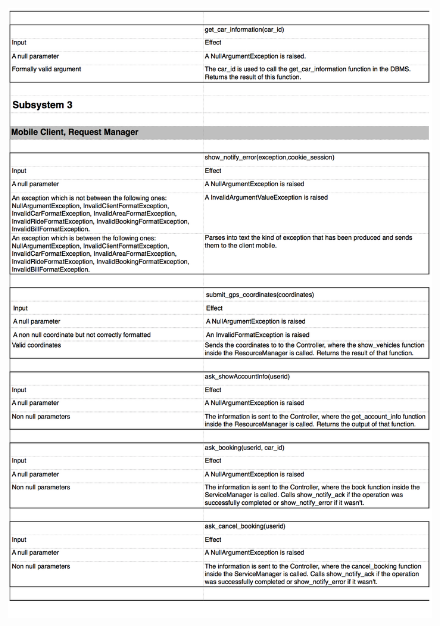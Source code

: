 \documentclass[a4paper,10pt]{article}
\begin{document}
    \begin{figure}[!h]
  \centering
    \includegraphics[scale=0.26]{Resources/8.png}
  \end{figure}
\end{document}
